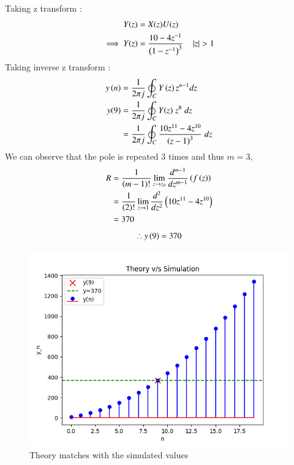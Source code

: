 \documentclass[journal,12pt,twocolumn]{IEEEtran}
\theoremstyle{remark}
\begin{document}
Taking z transform :
\begin{align}
    Y(z) &= X(z) U(z)\\
    \implies Y(z) &=\frac{10-4z^{-1}}{\left(1-z^{-1}\right)^3} \quad \left\vert z\right\vert > 1
\end{align}
Taking inverse z transform :
\begin{align}
    y\left(n\right) & =  \frac{1}{2\pi j} \oint_C Y\left(z\right) z^{n-1} dz  \\
    y(9)&=\frac{1}{2\pi j}\oint_{C}Y(z) \;z^{8} \;dz  \\
    &=\frac{1}{2\pi j}\oint_{C}\frac{10z^{11}-4z^{10}}{{\left(z-1\right)}^{3}} \;dz 
\end{align}
We can observe that the pole is repeated $3$ times and thus $m=3$,
\begin{align}
    R&=\frac{1}{\left(m-1\right)!}\lim\limits_{z\to z_{0}}\frac{d^{m-1}}{dz^{m-1}}\left(f\left(z\right)\right)  \\
    &=\frac{1}{\left(2\right)!}\lim\limits_{z\to 1}\frac{d^{2}}{dz^{2}}\left(10z^{11}-4z^{10}\right) \\
    &=370
\end{align}
\begin{align}
    \therefore y\left(9\right)=370
\end{align}


\begin{figure}[H]
    \includegraphics[width=1\columnwidth]{figs/Ncert_10.5.3.20stemplot.png}
    \caption{Theory matches with the simulated values}
    \label{fig:plot10.5.3.20}
\end{figure}
\end{document}
